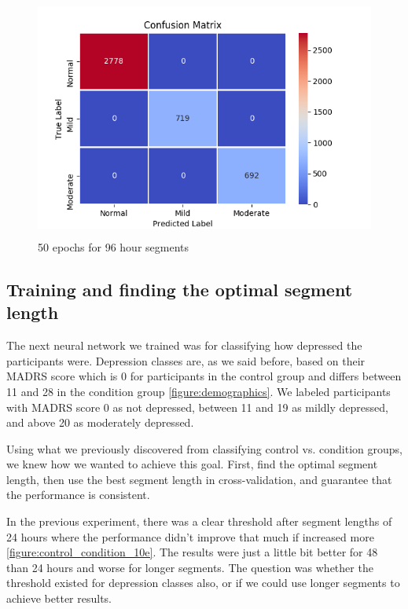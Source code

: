 \begin{figure}
      \includegraphics[height=8cm]{img/depression_class/conf_5760_60_50_32.png}
      \caption{50 epochs for 96 hour segments}
      \label{figure:depression_class_confusion_matrix_96h}
\end{figure}

\subsection{Training and finding the optimal segment length}

The next neural network we trained was for classifying how depressed the participants were. Depression classes are, as we said before, 
based on their MADRS score which is 0 for participants in the control group and differs between 11 and 28 in the condition group \ref{figure:demographics}. 
We labeled participants with MADRS score 0 as not depressed, between 11 and 19 as mildly depressed, and above 20 as moderately depressed. 

Using what we previously discovered from classifying control vs. condition groups, we knew how we wanted to achieve this goal. 
First, find the optimal segment length, then use the best segment length in cross-validation, and guarantee that the performance is consistent. 

In the previous experiment, there was a clear threshold after segment lengths of 24 hours where the performance didn't improve that much if increased more 
\ref{figure:control_condition_10e}. The results were just a little bit better for 48 than 24 hours and worse for longer segments. 
The question was whether the threshold existed for depression classes also, or if we could use longer segments to achieve better results.

